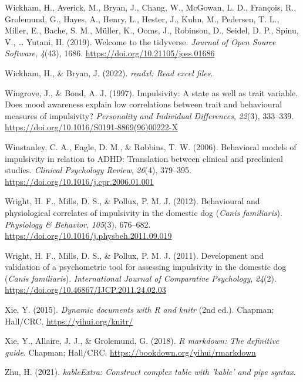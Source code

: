 \documentclass[
  ,pub,floatsintext]{apa6}
\newlength{\cslhangindent}
\newlength{\cslentryspacingunit} %
\newenvironment{CSLReferences}[2] %
 {%
  \setlength{\parindent}{0pt}
  \ifodd #1
  \let\oldpar\par
  \def\par{\hangindent=\cslhangindent\oldpar}
  \fi
  \setlength{\parskip}{#2\cslentryspacingunit}
 }%
 {}
\begin{document}
\begin{CSLReferences}{1}{0}
\leavevmode{}%
Wickham, H., Averick, M., Bryan, J., Chang, W., McGowan, L. D., François, R., Grolemund, G., Hayes, A., Henry, L., Hester, J., Kuhn, M., Pedersen, T. L., Miller, E., Bache, S. M., Müller, K., Ooms, J., Robinson, D., Seidel, D. P., Spinu, V., \ldots{} Yutani, H. (2019). Welcome to the {tidyverse}. \emph{Journal of Open Source Software}, \emph{4}(43), 1686. \url{https://doi.org/10.21105/joss.01686}

\leavevmode{}%
Wickham, H., \& Bryan, J. (2022). \emph{{readxl}: Read excel files}.

\leavevmode{}%
Wingrove, J., \& Bond, A. J. (1997). Impulsivity: {A} state as well as trait variable. {Does} mood awareness explain low correlations between trait and behavioural measures of impulsivity? \emph{Personality and Individual Differences}, \emph{22}(3), 333--339. \url{https://doi.org/10.1016/S0191-8869(96)00222-X}

\leavevmode{}%
Winstanley, C. A., Eagle, D. M., \& Robbins, T. W. (2006). Behavioral models of impulsivity in relation to {ADHD}: Translation between clinical and preclinical studies. \emph{Clinical Psychology Review}, \emph{26}(4), 379--395. \url{https://doi.org/10.1016/j.cpr.2006.01.001}

\leavevmode{}%
Wright, H. F., Mills, D. S., \& Pollux, P. M. J. (2012). Behavioural and physiological correlates of impulsivity in the domestic dog (\emph{{Canis} familiaris}). \emph{Physiology \& Behavior}, \emph{105}(3), 676--682. \url{https://doi.org/10.1016/j.physbeh.2011.09.019}

\leavevmode{}%
Wright, H. F., Mills, D. S., \& Pollux, P. M. J. (2011). Development and validation of a psychometric tool for assessing impulsivity in the domestic dog (\emph{{Canis} familiaris}). \emph{International Journal of Comparative Psychology}, \emph{24}(2). \url{https://doi.org/10.46867/IJCP.2011.24.02.03}

\leavevmode{}%
Xie, Y. (2015). \emph{Dynamic documents with {R} and knitr} (2nd ed.). Chapman; Hall/CRC. \url{https://yihui.org/knitr/}

\leavevmode{}%
Xie, Y., Allaire, J. J., \& Grolemund, G. (2018). \emph{R markdown: The definitive guide}. Chapman; Hall/CRC. \url{https://bookdown.org/yihui/rmarkdown}

\leavevmode{}%
Zhu, H. (2021). \emph{kableExtra: Construct complex table with 'kable' and pipe syntax}.

\end{CSLReferences}
\end{document}
